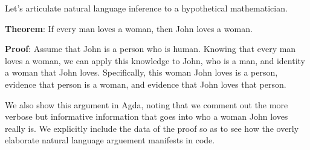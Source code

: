 
Let's articulate natural language inference to a hypothetical mathematician.

\textbf{Theorem}:
  If every man loves a woman, then John loves a woman.

\textbf{Proof}:
Assume that John is a person who is human. Knowing that every man
  loves a woman, we can apply this knowledge to John, who is a man, and identity a
woman that John loves. Specifically, this woman John loves is a person, evidence
that person is a woman, and evidence that John loves that person.

We also show this argument in Agda, noting that we comment out the more verbose
but informative information that goes into who a woman John loves really is. We
explicitly include the data of the proof so as to see how the overly elaborate
natural language arguement manifests in code. 

\begin{code}%
\>[0]\<%
\\
\>[0]\AgdaSpace{}%
\AgdaSymbol{:}\AgdaSpace{}%
\AgdaSpace{}%
\AgdaSpace{}%
\<%
\\
\>[0]\AgdaSpace{}%
\AgdaSpace{}%
\AgdaSymbol{=}\AgdaSpace{}%
\AgdaSpace{}%
\<%
\\
\>[0][@{}l@{\AgdaIndent{0}}]%
\>[2]\<%
\\
\>[2][@{}l@{\AgdaIndent{0}}]%
\>[4]\AgdaSpace{}%
\AgdaSymbol{:}\AgdaSpace{}%
\AgdaSpace{}%
\AgdaSpace{}%
\AgdaSpace{}%
\AgdaSpace{}%
\AgdaSpace{}%
\AgdaSpace{}%
\AgdaSymbol{(}\AgdaSpace{}%
\AgdaSymbol{)}\AgdaSpace{}%
\AgdaSpace{}%
\AgdaBound{\AgdaUnderscore{}}\AgdaSpace{}%
\AgdaSpace{}%
\AgdaSpace{}%
\AgdaSpace{}%
\AgdaSymbol{))}\<%
\\
%
\>[4]\AgdaSpace{}%
\AgdaSymbol{=}\AgdaSpace{}%
\AgdaSpace{}%
\AgdaSpace{}%
\<%
\\
%
\>[4]\<%
\\
%
\>[4]\<%
\\
%
\>[4]\<%
\\
%
\>[4]\<%
\\
%
\>[4]\<%
\\
%
\>[4]\<%
\end{code}

